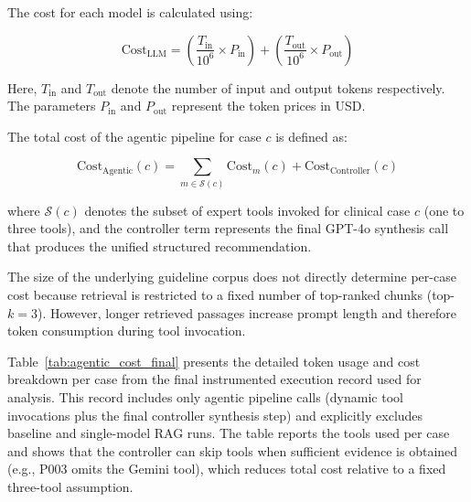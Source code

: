 \documentclass[preprint,12pt]{elsarticle}
\begin{document}
The cost for each model is calculated using:

\begin{equation}
\text{Cost}_{\text{LLM}} = \left( \frac{T_{\text{in}}}{10^6} \times P_{\text{in}} \right) + \left( \frac{T_{\text{out}}}{10^6} \times P_{\text{out}} \right)
\label{eq:llm_cost}
\end{equation}

\noindent
Here, \( T_{\text{in}} \) and \( T_{\text{out}} \) denote the number of input and output tokens respectively. The parameters \( P_{\text{in}} \) and \( P_{\text{out}} \) represent the token prices in USD.

\noindent
The total cost of the agentic pipeline for case \(c\) is defined as:

\begin{equation}
\text{Cost}_{\text{Agentic}}(c) = \sum_{m \in \mathcal{S}(c)} \text{Cost}_{m}(c) + \text{Cost}_{\text{Controller}}(c)
\label{eq:agentic_cost}
\end{equation}

\noindent
where $\mathcal{S}(c)$ denotes the subset of expert tools invoked for clinical case $c$ (one to three tools), and the controller term represents the final GPT-4o synthesis call that produces the unified structured recommendation.

The size of the underlying guideline corpus does not directly determine per-case cost because retrieval is restricted to a fixed number of top-ranked chunks (top-$k=3$). However, longer retrieved passages increase prompt length and therefore token consumption during tool invocation.

Table~\ref{tab:agentic_cost_final} presents the detailed token usage and cost breakdown per case from the final instrumented execution record used for analysis. This record includes only agentic pipeline calls (dynamic tool invocations plus the final controller synthesis step) and explicitly excludes baseline and single-model RAG runs. The table reports the tools used per case and shows that the controller can skip tools when sufficient evidence is obtained (e.g., P003 omits the Gemini tool), which reduces total cost relative to a fixed three-tool assumption.
\end{document}

